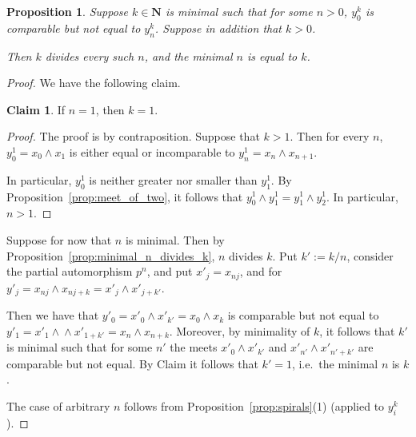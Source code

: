 \documentclass[final,a4paper,12pt,reqno]{amsart}
\newcommand{\bN}{{\mathbf{N}}}
\newcommand{\meet}{\mathop{\wedge}}
\newtheorem{prop}[thm]{Proposition}
\theoremstyle{remark}
\theoremstyle{definition}
\newtheorem*{clm*}{Claim}
\let \geq \geqslant
\begin{document}
	\begin{prop}
		\label{prop:comb_minimal_n}
		Suppose $k\in \bN$ is minimal such that for some $n>0$, $y^k_0$ is comparable but not equal to $y^k_n$. Suppose in addition that $k>0$.
		
		Then $k$ divides every such $n$, and the minimal $n$ is equal to $k$.
	\end{prop}
	\begin{proof}
		We have the following claim.
		
		\begin{clm*}
			If $n=1$, then $k=1$.
		\end{clm*}
		\begin{proof}
			The proof is by contraposition. Suppose that $k>1$. Then for every $n$, $y^1_0=x_0\meet x_1$ is either equal or incomparable to $y^1_n=x_n\meet x_{n+1}$.
			
			In particular, $y^1_0$ is neither greater nor smaller than $y^1_1$. By Proposition~\ref{prop:meet_of_two}, it follows that $y^1_0\meet y^1_1=y^1_1\meet y^1_2$. In particular, $n>1$.
		\end{proof}
		
		Suppose for now that $n$ is minimal. Then by Proposition~\ref{prop:minimal_n_divides_k}, $n$ divides $k$. Put $k':=k/n$, consider the partial automorphism $p^n$, and put $x'_j=x_{nj}$, and for $y'_j=x_{nj}\meet x_{nj+k}=x'_j\meet x'_{j+k'}$.
		
		Then we have that $y'_0=x'_0\meet x'_{k'}=x_0\meet x_{k}$ is comparable but not equal to $y'_1=x'_1\meet \meet x'_{1+k'}=x_n\meet x_{n+k}$. Moreover, by minimality of $k$, it follows that $k'$ is minimal such that for some $n'$ the meets $x'_{0}\meet x'_{k'}$ and $x'_{n'}\meet x'_{n'+k'}$ are comparable but not equal. By Claim it follows that $k'=1$, i.e.\ the minimal $n$ is $k$.
		
		The case of arbitrary $n$ follows from Proposition~\ref{prop:spirals}(1) (applied to $y^k_i$).
	\end{proof}
	
\end{document}
